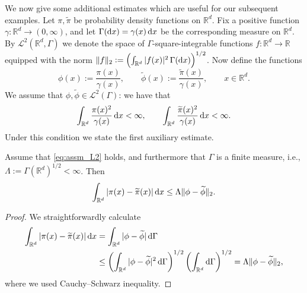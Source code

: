 \documentclass{aptpub}
\newcommand{\Rd}{\mathbb R^d}
\begin{document}
We now give some additional estimates which are useful for our subsequent examples. 
Let $\pi,\widetilde \pi$ be probability density functions on $\Rd$. Fix a positive function $\gamma: \Rd \to (0,\infty)$, and let $\Gamma(\dif x)=\gamma(x)\dif x$ be the corresponding measure on $\Rd$. 
By $\mathcal L^2(\Rd,\Gamma)$ we denote the space of $\Gamma$-square-integrable functions $f\colon \mathbb{R}^d \to \mathbb{R}$ equipped with the norm 
$\Vert f \Vert_2 := \left( \int_{\mathbb{R}^d} \vert f(x) \vert^2 \,\Gamma(\dif x) \right)^{1/2}$. Now define the functions
\begin{equation*}
    \phi(x) := \frac{\pi(x)}{\gamma(x)},\qquad \widetilde \phi(x) := \frac{\widetilde \pi(x)}{\gamma(x)}, \qquad x\in\mathbb{R}^d.
\end{equation*}
We assume that $\phi,\widetilde \phi \in \mathcal L^2(\Gamma)$: we have that 
\begin{equation}
    \int_{\mathbb{R}^d} \frac{\pi(x)^2}{\gamma(x)}\dif x <\infty, \qquad \int_{\mathbb{R}^d} \frac{\widetilde \pi(x)^2}{\gamma(x)}\dif x<\infty.
    \label{eq:assm_L2}
\end{equation}
Under this condition we state the first auxiliary estimate.
\begin{lemma}\label{lemma:L1_to_L2}
    Assume that \eqref{eq:assm_L2} holds, and furthermore that $\Gamma$ is a finite measure, i.e., $\Lambda:= \Gamma(\mathbb{R}^d)^{1/2}<\infty$.
      Then
    \begin{equation*}
        \int_{\mathbb{R}^d}|\pi(x)-\widetilde \pi(x)|\dif x \le \Lambda \|\phi-\widetilde \phi\|_2.
    \end{equation*}
\end{lemma}
\begin{proof}
    We straightforwardly calculate
    \begin{equation*}
        \begin{split}
             \int_{\mathbb{R}^d}|\pi(x)-\widetilde \pi(x)|\dif x&=\int_{\mathbb{R}^d} |\phi-\widetilde \phi|\dif \Gamma \\
             &\le \left( \int_{\mathbb{R}^d} |\phi-\widetilde \phi|^{2}\dif \Gamma \right)^{1/2}\left (\int_{\mathbb{R}^d} \dif \Gamma \right )^{1/2} 
             = \Lambda \|\phi-\widetilde \phi\|_2,
        \end{split}
    \end{equation*}
    where we used Cauchy--Schwarz inequality.
\end{proof}
\end{document}

